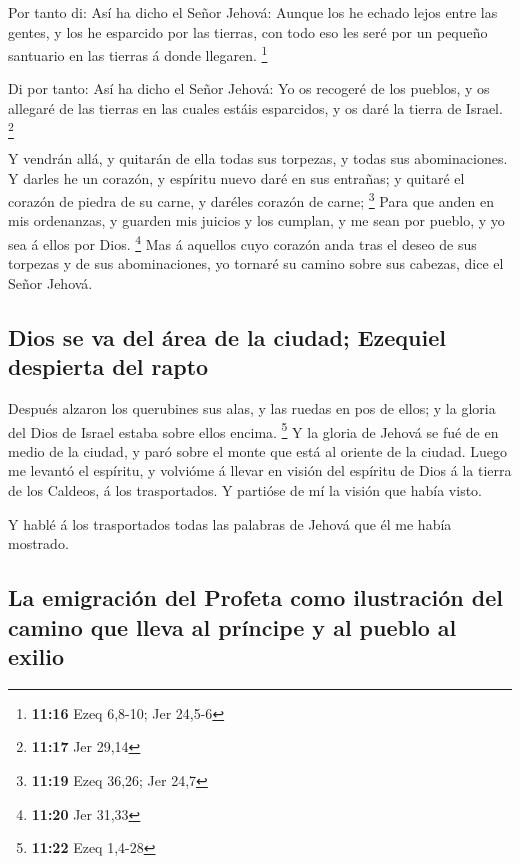  Por tanto di: Así ha dicho el Señor Jehová: Aunque los he
echado lejos entre las gentes, y los he esparcido por las tierras, con
todo eso les seré por un pequeño santuario en las tierras á donde
llegaren. \footnote{\textbf{11:16} Ezeq 6,8-10; Jer 24,5-6}

 Di por tanto: Así ha dicho el Señor Jehová: Yo os recogeré
de los pueblos, y os allegaré de las tierras en las cuales estáis
esparcidos, y os daré la tierra de Israel. \footnote{\textbf{11:17} Jer
  29,14}

 Y vendrán allá, y quitarán de ella todas sus torpezas, y
todas sus abominaciones.  Y darles he un corazón, y
espíritu nuevo daré en sus entrañas; y quitaré el corazón de piedra de
su carne, y daréles corazón de carne; \footnote{\textbf{11:19} Ezeq
  36,26; Jer 24,7}  Para que anden en mis ordenanzas, y
guarden mis juicios y los cumplan, y me sean por pueblo, y yo sea á
ellos por Dios. \footnote{\textbf{11:20} Jer 31,33}  Mas á
aquellos cuyo corazón anda tras el deseo de sus torpezas y de sus
abominaciones, yo tornaré su camino sobre sus cabezas, dice el Señor
Jehová.

\hypertarget{dios-se-va-del-uxe1rea-de-la-ciudad-ezequiel-despierta-del-rapto}{%
\subsection{Dios se va del área de la ciudad; Ezequiel despierta del
rapto}\label{dios-se-va-del-uxe1rea-de-la-ciudad-ezequiel-despierta-del-rapto}}

 Después alzaron los querubines sus alas, y las ruedas en
pos de ellos; y la gloria del Dios de Israel estaba sobre ellos encima.
\footnote{\textbf{11:22} Ezeq 1,4-28}  Y la gloria de
Jehová se fué de en medio de la ciudad, y paró sobre el monte que está
al oriente de la ciudad.  Luego me levantó el espíritu, y
volvióme á llevar en visión del espíritu de Dios á la tierra de los
Caldeos, á los trasportados. Y partióse de mí la visión que había visto.

 Y hablé á los trasportados todas las palabras de Jehová
que él me había mostrado.

\hypertarget{la-emigraciuxf3n-del-profeta-como-ilustraciuxf3n-del-camino-que-lleva-al-pruxedncipe-y-al-pueblo-al-exilio}{%
\subsection{La emigración del Profeta como ilustración del camino que
lleva al príncipe y al pueblo al
exilio}\label{la-emigraciuxf3n-del-profeta-como-ilustraciuxf3n-del-camino-que-lleva-al-pruxedncipe-y-al-pueblo-al-exilio}}


